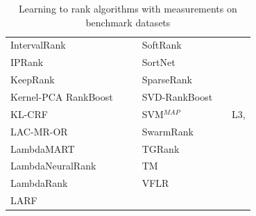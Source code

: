 \documentclass{sig-alternate}
\begin{document}
\begin{table}[!hpt]
{\begin{tabular}{lll|lll}
IntervalRank & \cite{Moon2010} & \cite{Moon2010, Freno2011} & SoftRank & \cite{Taylor2008, Guiver2008} & \cite{Qin2010b} \\ 
IPRank & \cite{Wang2009b} & \cite{Wang2009b, Torkestani2012} & SortNet & \cite{Rigutini2008} & \cite{Rigutini2008,Freno2011} \\
KeepRank & \cite{Chen2009} & \cite{Chen2009} & SparseRank & \cite{Lai2013b} & \cite{Lai2013b} \\ 
Kernel-PCA RankBoost & \cite{Duh2008} & \cite{Duh2008, Sato2013} & SVD-RankBoost & \cite{Lin2009} & \cite{Lin2009} \\
KL-CRF & \cite{Volkovs2011} & \cite{Volkovs2011} & SVM$^{MAP}$ & \cite{Yue2007} & L3, \cite{Wang2012, Xu2008, Niu2012} \\ 
LAC-MR-OR & \cite{Veloso2008} & \cite{Veloso2008} & SwarmRank & \cite{Diaz-Aviles2009} & \cite{Sato2013} \\ 
LambdaMART & \cite{Burges2010} & \cite{Asadi2013a, Ganjisaffar2011c} & TGRank & \cite{Lai2013} & \cite{Lai2013} \\ 
LambdaNeuralRank & \cite{Papini2012} & \cite{Papini2012} & TM & \cite{Zhou2008} & \cite{Zhou2008, Papini2012, Tan2013} \\ 
LambdaRank & \cite{Burges2006} &  & VFLR & \cite{Cai2012} & \cite{Cai2012} \\ 
LARF & \cite{Torkestani2012} & \cite{Torkestani2012} &  &  &  \\
\bottomrule
\end{tabular}
\caption{Learning to rank algorithms with measurements on benchmark datasets}}
\label{tab:ltr_methods_used}
\end{table}
\end{document}
